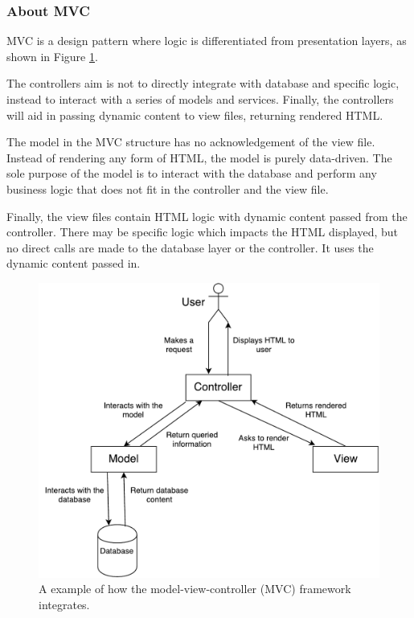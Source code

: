 \subsubsection{About MVC}
MVC is a design pattern where logic is differentiated from presentation layers, as shown in Figure \ref{fig:mvc}.

The controllers aim is not to directly integrate with database and specific logic, instead to interact with a series of models and services. Finally, the controllers will aid in passing dynamic content to view files, returning rendered HTML.

The model in the MVC structure has no acknowledgement of the view file. Instead of rendering any form of HTML, the model is purely data-driven. The sole purpose of the model is to interact with the database and perform any business logic that does not fit in the controller and the view file.

Finally, the view files contain HTML logic with dynamic content passed from the controller. There may be specific logic which impacts the HTML displayed, but no direct calls are made to the database layer or the controller. It uses the dynamic content passed in.

\begin{figure}[H]
  \centering
  \includegraphics[scale=0.38]{images/MVC.pdf}
  \caption{A example of how the model-view-controller (MVC) framework integrates.}
  \label{fig:mvc}
\end{figure}

